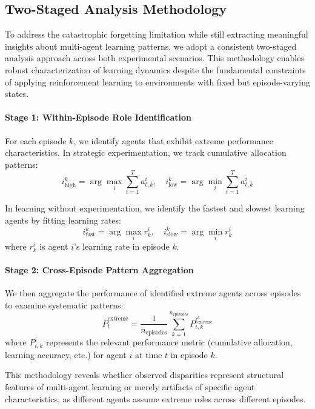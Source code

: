 \subsection{Two-Staged Analysis Methodology}
\label{sec:two-staged-analysis}

To address the catastrophic forgetting limitation while still extracting meaningful insights about multi-agent learning patterns, we adopt a consistent two-staged analysis approach across both experimental scenarios. This methodology enables robust characterization of learning dynamics despite the fundamental constraints of applying reinforcement learning to environments with fixed but episode-varying states.

\paragraph{Stage 1: Within-Episode Role Identification} For each episode $k$, we identify agents that exhibit extreme performance characteristics. In strategic experimentation, we track cumulative allocation patterns:
\begin{equation}
    i_{\text{high}}^k = \arg\max_i \sum_{t=1}^T a_{t,k}^i, \quad 
    i_{\text{low}}^k = \arg\min_i \sum_{t=1}^T a_{t,k}^i
\end{equation}

In learning without experimentation, we identify the fastest and slowest learning agents by fitting learning rates:
\begin{equation}
    i_{\text{fast}}^k = \arg\max_i r_k^i, \quad 
    i_{\text{slow}}^k = \arg\min_i r_k^i
\end{equation}
where $r_k^i$ is agent $i$'s learning rate in episode $k$.

\paragraph{Stage 2: Cross-Episode Pattern Aggregation} We then aggregate the performance of identified extreme agents across episodes to examine systematic patterns:
\begin{equation}
    \bar{P}_t^{\text{extreme}} = \frac{1}{n_{\text{episodes}}} \sum_{k=1}^{n_{\text{episodes}}} P_{t,k}^{i_{\text{extreme}}^k}
\end{equation}
where $P_{t,k}^i$ represents the relevant performance metric (cumulative allocation, learning accuracy, etc.) for agent $i$ at time $t$ in episode $k$.

This methodology reveals whether observed disparities represent structural features of multi-agent learning or merely artifacts of specific agent characteristics, as different agents assume extreme roles across different episodes.

